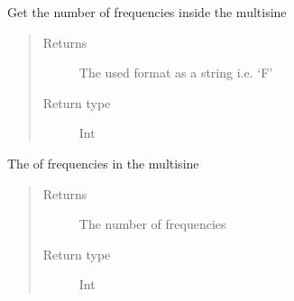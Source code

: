 \documentclass[letterpaper,10pt,english]{sphinxmanual}
\begin{document}
\begin{fulllineitems}
\begin{fulllineitems}
\begin{quote}
\begin{description}
\end{description}\end{quote}

\end{fulllineitems}


\begin{fulllineitems}
\label{\detokenize{index:TiePieLCR_settings.TiePieLCR_settings.get_number_of_demodulate_freqs}}
\sphinxAtStartPar
Get the number of frequencies inside the multisine
\begin{quote}\begin{description}
\item[{Returns}] \leavevmode
\sphinxAtStartPar
The used format as a string i.e. ‘F’

\item[{Return type}] \leavevmode
\sphinxAtStartPar
Int

\end{description}\end{quote}

\end{fulllineitems}


\begin{fulllineitems}
\label{\detokenize{index:TiePieLCR_settings.TiePieLCR_settings.get_number_of_demodulation_freqs}}
\sphinxAtStartPar
The of frequencies in the multisine
\begin{quote}\begin{description}
\item[{Returns}] \leavevmode
\sphinxAtStartPar
The number of frequencies

\item[{Return type}] \leavevmode
\sphinxAtStartPar
Int

\end{description}\end{quote}


\end{fulllineitems}
\end{fulllineitems}
\end{document}
